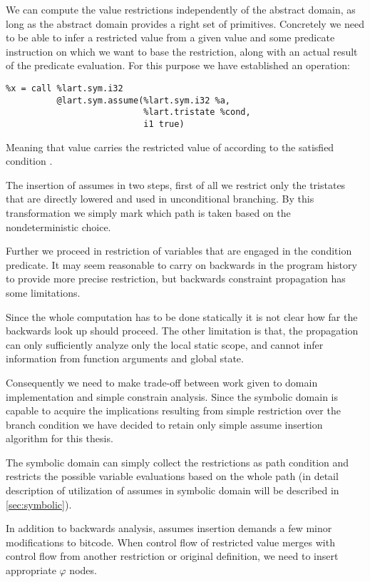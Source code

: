 We can compute the value restrictions independently of the abstract domain, as
long as the abstract domain provides a right set of primitives. Concretely we
need to be able to infer a restricted value from a given value and some predicate
instruction on which we want to base the restriction, along with an actual
result of the predicate evaluation. For this purpose we have established
an  operation:
\begin{verbatim}
%x = call %lart.sym.i32
          @lart.sym.assume(%lart.sym.i32 %a,
                           %lart.tristate %cond,
                           i1 true)
\end{verbatim}
Meaning that value  carries the restricted value of 
according to the satisfied condition .

The insertion of assumes in two steps, first of all we restrict only the
tristates that are directly lowered and used in unconditional branching. By this
transformation we simply mark which path is taken based on the nondeterministic
choice.

Further we proceed in restriction of variables that are engaged in the condition
predicate. It may seem reasonable to carry on backwards in the program history to
provide more precise restriction, but backwards constraint propagation has some
limitations.


Since the whole computation has to be done statically it is not clear how far the
backwards look up should proceed. The other limitation is that, the propagation
can only sufficiently analyze only the local static scope, and cannot infer
information from function arguments and global state.

Consequently we need to make trade-off between work given to domain
implementation and simple constrain analysis. Since the symbolic domain is
capable to acquire the implications resulting from simple restriction over the
branch condition we have decided to retain only simple assume insertion
algorithm for this thesis.

The symbolic domain can simply collect the restrictions as path condition and
restricts the possible variable evaluations based on the whole path
(in detail description of utilization of assumes in symbolic domain will be
described in \autoref{sec:symbolic}).

In addition to backwards analysis, assumes insertion demands a few minor
modifications to bitcode. When control flow of restricted value merges with
control flow from another restriction or original definition, we need to insert
appropriate $\varphi$ nodes.

